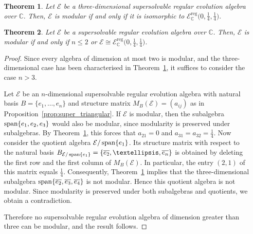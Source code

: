 \documentclass[10pt,a4paper]{amsart}
\newtheorem{theorem}{Theorem}
\newcommand{\E}{\mathcal{E}}
\DeclareMathOperator{\spa}{\textup{\textsf{span}}}
\begin{document}
\begin{theorem}\label{th:char_mod}
Let $\mathcal{E}$ be a three-dimensional supersolvable regular evolution algebra over $\mathbb{C}$. Then, $\mathcal{E}$ is modular if and only if it is isomorphic to $\mathcal{E}_\mathbb{C}^{\mathrm{reg}}\big(0,\frac{1}{4},\frac{1}{4}\big)$.
\end{theorem}

\begin{theorem}\label{th:char_sup_reg}
Let $\mathcal{E}$ be a supersolvable regular evolution algebra over $\mathbb{C}$. Then, $\mathcal{E}$ is modular if and only if $n\leq2$ or $\mathcal{E}\cong\mathcal{E}_\mathbb{C}^{\mathrm{reg}}\big(0,\frac{1}{4},\frac{1}{4}\big)$.
\end{theorem}

\begin{proof}
Since every algebra of dimension at most two is modular, and the three-dimensional case has been characterised in Theorem~\ref{th:char_mod}, it suffices to consider the case $n>3$.
	
Let $\mathcal{E}$ be an $n$-dimensional supersolvable regular evolution algebra with natural basis $B=\{e_1,\dots,e_n\}$ and structure matrix $M_B(\mathcal{E})=(a_{ij})$ as in Proposition~\ref{prop:super_triangular}. If $\mathcal{E}$ is modular, then the subalgebra $\spa\{e_1,e_2,e_3\}$ would also be modular, since modularity is preserved under subalgebras. By Theorem~\ref{th:char_mod}, this forces that $a_{21}=0$ and $a_{31}=a_{32}=\frac{1}{4}$.
Now consider the quotient algebra $\mathcal{E}/\spa\{e_1\}$. Its structure matrix with respect to the natural basis $B_{\E/\spa\{e_1\}}=\{\overline{e_2},\dots,\overline{e_n}\}$ is obtained by deleting the first row and the first column of $M_B(\mathcal{E})$. In particular, the entry $(2,1)$ of this matrix equals $\tfrac14$. Consequently, Theorem~\ref{th:char_mod} implies that the three-dimensional subalgebra $\spa\{\overline{e_2},\overline{e_3},\overline{e_4}\}$ is not modular. Hence this quotient algebra is not modular.
Since modularity is preserved under both subalgebras and quotients, we obtain a contradiction. 

Therefore no supersolvable regular evolution algebra of dimension greater than three can be modular, and the result follows.
\end{proof}
\end{document}
